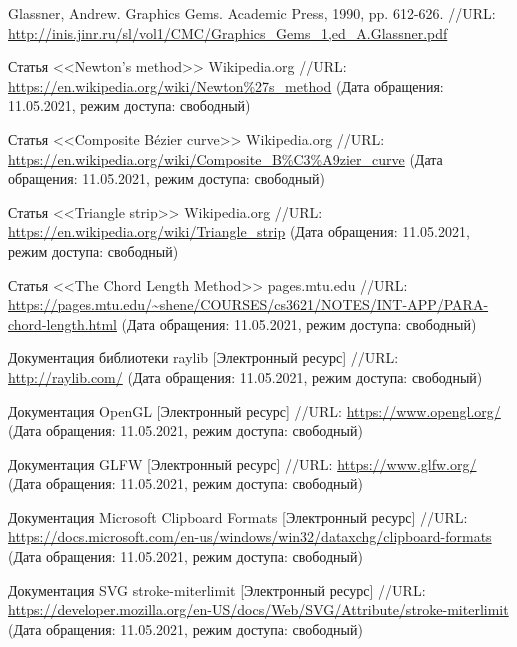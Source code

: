 \documentclass[a4paper,12pt]{article}
\begin{document}
  \begin{CRTbibliography}
    Glassner, Andrew. Graphics Gems. Academic Press, 1990, pp. 612-626.
    //URL: \url{http://inis.jinr.ru/sl/vol1/CMC/Graphics_Gems_1,ed_A.Glassner.pdf}

    Статья <<Newton's method>> Wikipedia.org
    //URL: \url{https://en.wikipedia.org/wiki/Newton%27s_method}
    (Дата обращения: 11.05.2021, режим доступа: свободный)

    Статья <<Composite Bézier curve>> Wikipedia.org
    //URL: \url{https://en.wikipedia.org/wiki/Composite_B%C3%A9zier_curve}
    (Дата обращения: 11.05.2021, режим доступа: свободный)

    Статья <<Triangle strip>> Wikipedia.org
    //URL: \url{https://en.wikipedia.org/wiki/Triangle_strip}
    (Дата обращения: 11.05.2021, режим доступа: свободный)

    Статья <<The Chord Length Method>> pages.mtu.edu
    //URL: \url{https://pages.mtu.edu/~shene/COURSES/cs3621/NOTES/INT-APP/PARA-chord-length.html}
    (Дата обращения: 11.05.2021, режим доступа: свободный)

    Документация библиотеки raylib [Электронный ресурс] //URL: \url{http://raylib.com/}
    (Дата обращения: 11.05.2021, режим доступа: свободный)

    Документация OpenGL [Электронный ресурс] //URL: \url{https://www.opengl.org/}
    (Дата обращения: 11.05.2021, режим доступа: свободный)

    Документация GLFW [Электронный ресурс] //URL: \url{https://www.glfw.org/}
    (Дата обращения: 11.05.2021, режим доступа: свободный)

    Документация Microsoft Clipboard Formats [Электронный ресурс]
    //URL: \url{https://docs.microsoft.com/en-us/windows/win32/dataxchg/clipboard-formats}
    (Дата обращения: 11.05.2021, режим доступа: свободный)

    Документация SVG stroke-miterlimit [Электронный ресурс]
    //URL: \url{https://developer.mozilla.org/en-US/docs/Web/SVG/Attribute/stroke-miterlimit}
    (Дата обращения: 11.05.2021, режим доступа: свободный)
  \end{CRTbibliography}
\end{document}
